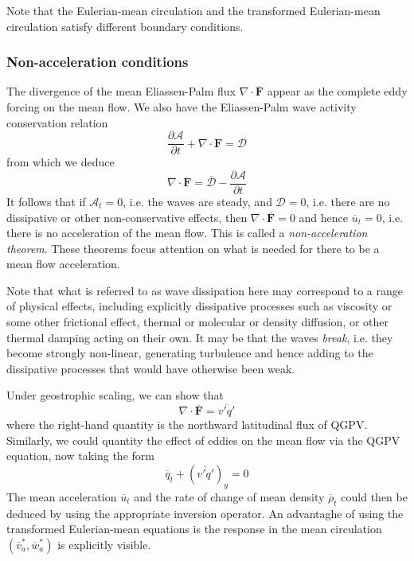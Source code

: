\documentclass{jknotes}
\begin{document}
Note that the Eulerian-mean circulation and the transformed Eulerian-mean
circulation satisfy different boundary conditions.

\subsubsection{Non-acceleration conditions}
The divergence of the mean Eliassen-Palm flux $\nabla \cdot
\overline{\symbf{F}}$ appear as the complete eddy forcing on the mean flow. We
also have the Eliassen-Palm wave activity conservation relation
\begin{equation}
	\frac{\partial \mathcal{A}}{\partial t} + \nabla \cdot \symbf{F} =
	\mathcal{D}
\end{equation}
from which we deduce
\begin{equation}
	\nabla \cdot \overline{\symbf{F}} = \overline{\mathcal{D}} -
	\frac{\partial \mathcal{A}}{\partial t}
\end{equation}
It follows that if $\mathcal{A}_t = 0$, i.e. the waves are steady, and
$\mathcal{D} = 0$, i.e. there are no dissipative or other non-conservative
effects, then $\nabla \cdot \overline{\symbf{F}} = 0$ and hence
$\overline{u}_t = 0$, i.e. there is no acceleration of the mean flow. This is
called a \emph{non-acceleration theorem}. These theorems focus attention on
what is needed for there to be a mean flow acceleration.

Note that what is referred to as wave dissipation here may correspond to a
range of physical effects, including explicitly dissipative processes such as
viscosity or some other frictional effect, thermal or molecular or density
diffusion, or other thermal damping acting on their own. It may be that the
waves \emph{break}, i.e. they become strongly non-linear, generating
turbulence and hence adding to the dissipative processes that would have
otherwise been weak.

Under geostrophic scaling, we can show that
\begin{equation}
	\nabla \cdot \overline{\symbf{F}} = \overline{v'q'}
\end{equation}
where the right-hand quantity is the northward latitudinal flux of QGPV.
Similarly, we could quantity the effect of eddies on the mean flow via the
QGPV equation, now taking the form
\begin{equation}
	\overline{q}_t + (\overline{v'q'})_y = 0
\end{equation}
The mean acceleration $\overline{u}_t$ and the rate of change of mean density
$\overline{\rho}_t$ could then be deduced by using the appropriate inversion
operator. An advantaghe of using the transformed Eulerian-mean equations is
the response in the mean circulation $(\overline{v}_a^*, \overline{w}_a^*)$ is
explicitly visible.
\end{document}
